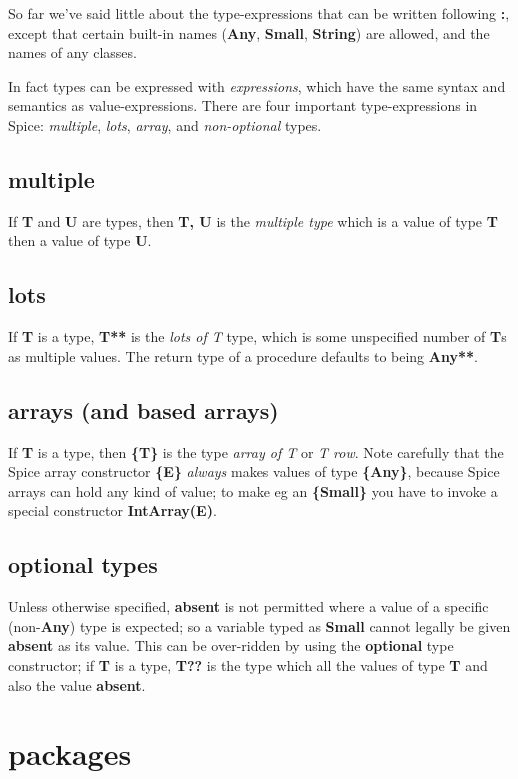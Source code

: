 \documentclass{report}
\begin{document}
So far we've said little about the type-expressions that can be written
following {\bf :}, except that certain built-in names ({\bf Any}, {\bf Small}, {\bf String})
are allowed, and the names of any classes.

In fact types can be expressed with {\em expressions}, which have the same syntax
and semantics as value-expressions. There are four important type-expressions
in Spice: {\em multiple}, {\em lots}, {\em array}, and {\em non-optional} types.

\section{multiple}


If {\bf T} and {\bf U} are types, then {\bf T, U} is the {\em multiple type} which is a value
of type {\bf T} then a value of type {\bf U}.\section{lots}


If {\bf T} is a type, {\bf T**} is the {\em lots of T} type, which is some unspecified
number of {\bf T}s as multiple values. The return type of a procedure defaults to
being {\bf Any**}.\section{arrays (and based arrays)}


If {\bf T} is a type, then {\bf \{T\}} is the type {\em array of T} or {\em T row}. Note
carefully that the Spice array constructor {\bf \{E\}} {\em always} makes values of
type {\bf \{Any\}}, because Spice arrays can hold any kind of value; to make eg
an {\bf \{Small\}} you have to invoke a special constructor {\bf IntArray(E)}.\section{optional types}


Unless otherwise specified, {\bf absent} is not permitted where a value of a
specific (non-{\bf Any}) type is expected; so a variable typed as {\bf Small} cannot
legally be given {\bf absent} as its value. This can be over-ridden by using the
{\bf optional} type constructor; if {\bf T} is a type, {\bf T??} is the type which all the
values of type {\bf T} and also the value {\bf absent}.\chapter{packages}
\end{document}
